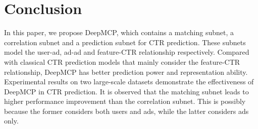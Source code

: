 \documentclass{article}
\begin{document}
\section{Conclusion}
In this paper, we propose DeepMCP, which contains a matching subnet, a correlation subnet and a prediction subnet for CTR prediction.
These subnets model the user-ad, ad-ad and feature-CTR relationship respectively. Compared with classical CTR prediction models that mainly consider the feature-CTR relationship, DeepMCP has better prediction power and representation ability. Experimental results on two large-scale datasets demonstrate the effectiveness of DeepMCP in CTR prediction.
It is observed that the matching subnet leads to higher performance improvement than the correlation subnet.
This is possibly because the former considers both users and ads, while the latter considers ads only.

\balance


\end{document}
